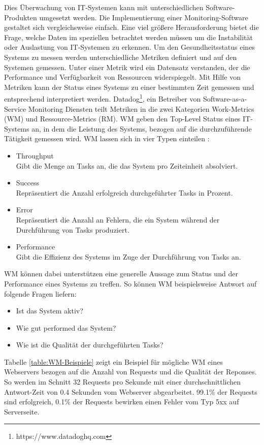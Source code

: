 \bigbreak
Dies Überwachung von IT-Systemen kann mit unterschiedlichen Software-Produkten umgesetzt werden. Die Implementierung einer Monitoring-Software gestaltet sich vergleichsweise einfach. Eine viel größere Herausforderung bietet die Frage, welche Daten im speziellen betrachtet werden müssen um die Instabilität oder Auslastung von IT-Systemen zu erkennen. Um den Gesundheitsstatus eines Systems zu messen werden unterschiedliche Metriken definiert und auf den Systemen gemessen. Unter einer Metrik wird ein Datensatz verstanden, der die Performance und Verfügbarkeit von Ressourcen widerspiegelt. Mit Hilfe von Metriken kann der Status eines Systems zu einer bestimmten Zeit gemessen und entsprechend interpretiert werden. \autocite{geißler_2019} 
\bigbreak
Datadog\footnote{https://www.datadoghq.com}, ein Betreiber von Software-as-a-Service Monitoring Diensten teilt Metriken in die zwei Kategorien \glqq{}Work-Metrics\grqq{} (WM) und \glqq{}Ressource-Metrics\grqq{} (RM). WM geben den Top-Level Status eines IT-Systems an, in dem die Leistung des Systems, bezogen auf die durchzuführende Tätigkeit gemessen wird. 
\bigbreak
WM lassen sich in vier Typen einteilen \autocite{le-quoc_2015}:
\begin{itemize}
    \item Throughput\\
    Gibt die Menge an Tasks an, die das System pro Zeiteinheit absolviert.
    \item Success\\
    Repräsentiert die Anzahl erfolgreich durchgeführter Tasks in Prozent.
    \item Error\\
    Repräsentiert die Anzahl an Fehlern, die ein System während der Durchführung von Tasks produziert.
    \item Performance\\
    Gibt die Effizienz des Systems im Zuge der Durchführung von Tasks an. 
\end{itemize}
\bigbreak
WM können dabei unterstützen eine generelle Aussage zum Status und der Performance eines Systems zu treffen. So können WM beispielsweise Antwort auf folgende Fragen liefern:
\begin{itemize}
    \item Ist das System aktiv?
    \item Wie gut performed das System?
    \item Wie ist die Qualität der durchgeführten Tasks?
\end{itemize}
\bigbreak
Tabelle \ref{table:WM-Beispiele} zeigt ein Beispiel für mögliche WM eines Webservers bezogen auf die Anzahl von Requests und die Qualität der Reponses.\\ So werden im Schnitt 32 Requests pro Sekunde mit einer durchschnittlichen Antwort-Zeit von 0.4 Sekunden vom Webserver abgearbeitet. 99.1\% der Requests sind erfolgreich, 0.1\% der Requests bewirken einen Fehler vom Typ 5xx auf Serverseite. 
